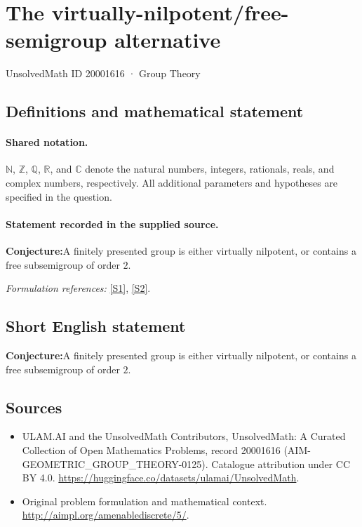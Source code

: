\documentclass[11pt]{article}
\newcommand{\sref}[2]{\hyperlink{source:#1:#2}{[S#2]}}
\begin{document}
\setcounter{section}{20001615}
\section{The virtually-nilpotent/free-semigroup alternative}\label{20001616}
{\small UnsolvedMath ID 20001616 · Group Theory}
\subsection{Definitions and mathematical statement}

\paragraph{Shared notation.}$\mathbb N$, $\mathbb Z$, $\mathbb Q$, $\mathbb R$, and $\mathbb C$ denote the natural numbers, integers, rationals, reals, and complex numbers, respectively. All additional parameters and hypotheses are specified in the question.


\paragraph{Statement recorded in the supplied source.}
\textbf{Conjecture:}A finitely presented group is either virtually nilpotent, or contains a free subsemigroup of order $2$.
\par\smallskip\textit{Formulation references:} \sref{20001616}{1}, \sref{20001616}{2}.
\subsection{Short English statement}
\textbf{Conjecture:}A finitely presented group is either virtually nilpotent, or contains a free subsemigroup of order $2$.
\subsection{Sources}
\begin{itemize}
\item[\hypertarget{source:20001616:1}{S1}] ULAM.AI and the UnsolvedMath Contributors, UnsolvedMath: A Curated Collection of Open Mathematics Problems, record 20001616 (AIM-GEOMETRIC\_GROUP\_THEORY-0125). Catalogue attribution under CC BY 4.0.
\url{https://huggingface.co/datasets/ulamai/UnsolvedMath}.
\item[\hypertarget{source:20001616:2}{S2}] Original problem formulation and mathematical context.
\url{http://aimpl.org/amenablediscrete/5/}.
\end{itemize}
\label{end:20001616}
\end{document}
